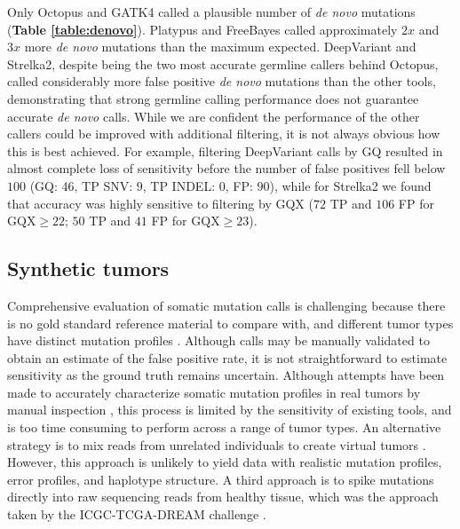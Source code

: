 \documentclass[notitlepage, twocolumn, 10pt]{article}
\begin{document}
Only Octopus and GATK4 called a plausible number of \textit{de novo} mutations (\textbf{Table \ref{table:denovo}}). Platypus and FreeBayes called approximately $2x$ and $3x$ more \textit{de novo} mutations than the maximum expected. DeepVariant and Strelka2, despite being the two most accurate germline callers behind Octopus, called considerably more false positive \emph{de novo} mutations than the other tools, demonstrating that strong germline calling performance does not guarantee accurate \textit{de novo} calls. While we are confident the performance of the other callers could be improved with additional filtering, it is not always obvious how this is best achieved. For example, filtering DeepVariant calls by GQ resulted in almost complete loss of sensitivity before the number of false positives fell below $100$ (GQ: $46$, TP SNV: $9$, TP INDEL: $0$, FP: $90$), while for Strelka2 we found that accuracy was highly sensitive to filtering by GQX ($72$ TP and $106$ FP for $\text{GQX} \ge 22$; $50$ TP and $41$ FP for $\text{GQX} \ge 23$).

\subsection*{Synthetic tumors}
Comprehensive evaluation of somatic mutation calls is challenging because there is no gold standard reference material to compare with, and different tumor types have distinct mutation profiles \cite{RN86}. Although calls may be manually validated to obtain an estimate of the false positive rate, it is not straightforward to estimate sensitivity as the ground truth remains uncertain. Although attempts have been made to accurately characterize somatic mutation profiles in real tumors by manual inspection \cite{RN155}, this process is limited by the sensitivity of existing tools, and is too time consuming to perform across a range of tumor types. An alternative strategy is to mix reads from unrelated individuals to create virtual tumors \cite{RN142, RN604}. However, this approach is unlikely to yield data with realistic mutation profiles, error profiles, and haplotype structure. A third approach is to spike mutations directly into raw sequencing reads from healthy tissue, which was the approach taken by the ICGC-TCGA-DREAM challenge \cite{RN147}.
\end{document}
